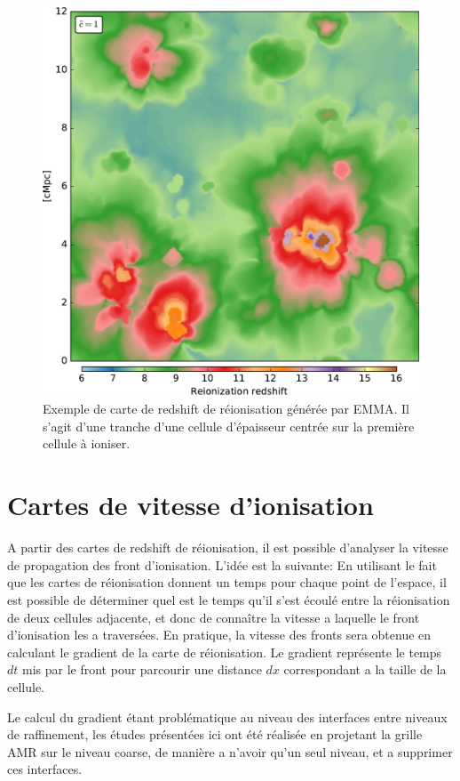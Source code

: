 \begin{figure}[htpb]
        \includegraphics[width=.95\linewidth]{img/04_mapreio/map_z_c1.pdf} 
        \caption{Exemple de carte de redshift de réionisation générée par EMMA.
        Il s'agit d'une tranche d'une cellule d'épaisseur centrée sur la première cellule à ioniser.
        }
 		\label{fig:zmap}
\end{figure}

\section{Cartes de vitesse d’ionisation}

A partir des cartes de redshift de réionisation, il est possible d’analyser la vitesse de propagation des front d'ionisation.
L'idée est la suivante:
En utilisant le fait que les cartes de réionisation donnent un temps pour chaque point de l'espace, il est possible de déterminer quel est le temps qu'il s'est écoulé entre la réionisation de deux cellules adjacente, et donc de connaître la vitesse a laquelle le front d'ionisation les a traversées.
En pratique, la vitesse des fronts sera obtenue en calculant le gradient de la carte de réionisation.
Le gradient représente le temps $dt$ mis par le front pour parcourir une distance $dx$ correspondant a la taille de la cellule.

Le calcul du gradient étant problématique au niveau des interfaces entre niveaux de raffinement, les études présentées ici ont été réalisée en projetant la grille \ac{AMR} sur le niveau coarse, de manière a n'avoir qu'un seul niveau, et a supprimer ces interfaces.

